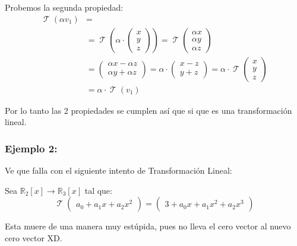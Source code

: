 \documentclass[12pt]{report}                                    %
\DeclareMathOperator \LinealTransformation {\mathcal{T}}        %
\newcommand{\pVector}[1]{                                       %
        \ensuremath{\begin{pmatrix}#1\end{pmatrix}}                 %
    }
\begin{document}
            Probemos la segunda propiedad:
            \begin{equation*}
            \begin{split}
                \LinealTransformation (\alpha v_1)                                                      & = \\
                &= \LinealTransformation \left( \alpha \cdot \pVector{x\\y\\z} \right)                      
                 = \LinealTransformation \pVector{\alpha x\\\alpha y\\\alpha z}                             \\
                &= \pVector{\alpha x - \alpha z\\ \alpha y + \alpha z}                                      
                 = \alpha \cdot \pVector{x-z\\y+z}                                                          
                 = \alpha \cdot \LinealTransformation \pVector{x\\y\\z}                                     \\
                &= \alpha \cdot \LinealTransformation (v_1)                                                 
            \end{split}
            \end{equation*}

            Por lo tanto las 2 propiedades se cumplen así que si que es una transformación lineal.

        \clearpage
        \subsubsection{Ejemplo 2:}

            Ve que falla con el siguiente intento de Transformación Lineal:

            Sea $\mathbb{R}_2[x] \to \mathbb{R}_3[x]$ tal que:
            \begin{equation*}
                \LinealTransformation \pVector{a_0+a_1x+a_2x^2} = \pVector{3+a_0x+a_1x^2+a_2x^3}
            \end{equation*}

            Esta muere de una manera muy estúpida, pues no lleva el cero vector al nuevo cero vector XD.
\end{document}
